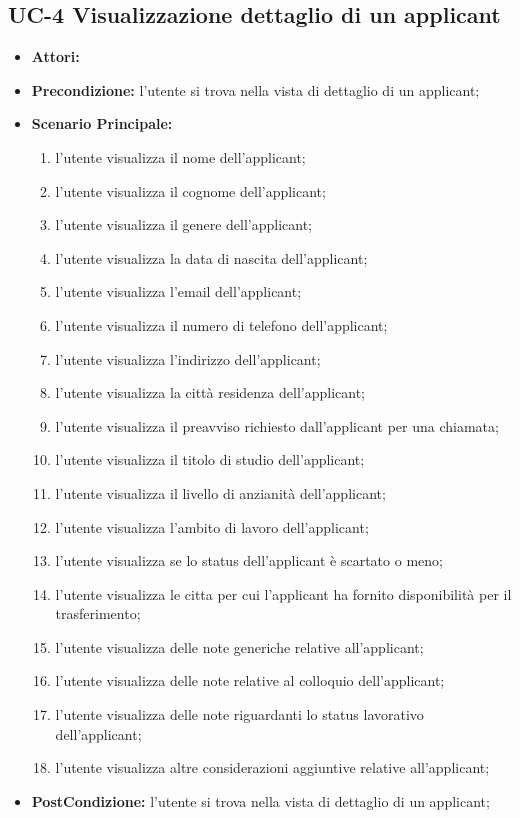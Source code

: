 \subsection{UC-4 Visualizzazione dettaglio di un applicant }
\begin{itemize}
	\item \textbf{Attori:} \loggedusr
	\item \textbf{Precondizione:}  l'utente si trova nella vista di dettaglio di un applicant;
	\item \textbf{Scenario Principale:}
	\begin{enumerate}
		\item l'utente visualizza il nome dell'applicant;
		\item l'utente visualizza il cognome dell'applicant;
		\item l'utente visualizza il genere dell'applicant;
		\item l'utente visualizza la data di nascita dell'applicant;
		\item l'utente visualizza l'email dell'applicant;
		\item l'utente visualizza il numero di telefono dell'applicant;	
		\item l'utente visualizza l'indirizzo dell'applicant;
		\item l'utente visualizza la città residenza dell'applicant;
		\item l'utente visualizza il preavviso richiesto dall'applicant per una chiamata;
		\item l'utente visualizza il titolo di studio dell'applicant;
		\item l'utente visualizza il livello di anzianità dell'applicant;
		\item l'utente visualizza l'ambito di lavoro dell'applicant;
		\item l'utente visualizza se lo status dell'applicant è scartato o meno;
		
		\item l'utente visualizza le citta per cui l'applicant ha fornito disponibilità per il trasferimento;
		\item l'utente visualizza delle note generiche relative all'applicant;
		\item l'utente visualizza delle note relative al colloquio dell'applicant;
		\item l'utente visualizza delle note riguardanti lo status lavorativo dell'applicant;
		\item l'utente visualizza altre considerazioni aggiuntive relative all'applicant;
	\end{enumerate}
	\item \textbf{PostCondizione:}  l'utente si trova nella vista di dettaglio di un applicant;
\end{itemize}

